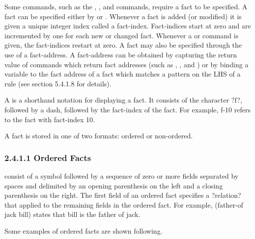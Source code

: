 \documentclass[letterpaper,10pt,english]{sphinxmanual}
\begin{document}
Some commands, such as the , , and 
commands, require a fact to be specified. A fact can be specified either
by  or . Whenever a fact is added (or
modified) it is given a unique integer index called a fact-index.
Fact-indices start at zero and are incremented by one for each new or
changed fact. Whenever a  or  command is given, the
fact-indices restart at zero. A fact may also be specified through the
use of a fact-address. A fact-address can be obtained by capturing the
return value of commands which return fact addresses (such as
, , and ) or by binding a variable to
the fact address of a fact which matches a pattern on the LHS of a rule
(see section 5.4.1.8 for details).

A  is a shorthand notation for displaying a fact. It
consists of the character ?f?, followed by a dash, followed by the
fact-index of the fact. For example, f-10 refers to the fact with
fact-index 10.

A fact is stored in one of two formats: ordered or non-ordered.


\subsubsection{2.4.1.1 Ordered Facts}
\label{\detokenize{overview:ordered-facts}}
 consist of a symbol followed by a sequence of zero or
more fields separated by spaces and delimited by an opening parenthesis
on the left and a closing parenthesis on the right. The first field of
an ordered fact specifies a ?relation? that applied to the remaining
fields in the ordered fact. For example, (father-of jack bill) states
that bill is the father of jack.

Some examples of ordered facts are shown following.

\begin{sphinxVerbatim}[commandchars=\\\{\}]
   

   

   
\end{sphinxVerbatim}
\end{document}

